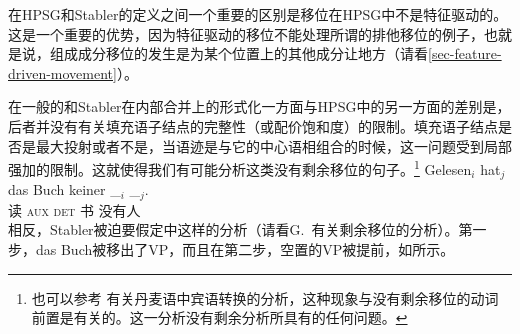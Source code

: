 在HPSG和Stabler的定义之间一个重要的区别是移位在HPSG中不是特征驱动的。这是一个重要的优势，因为特征驱动的移位不能处理所谓的排他移位\citep{Fanselow2003b}的例子，也就是说，组成成分移位的发生是为某个位置上的其他成分让地方（请看\ref{sec-feature-driven-movement}）。

在一般的\xbartc 和Stabler在内部合并上的形式化一方面与HPSG中的另一方面的差别是，后者并没有有关填充语子结点的完整性（或配价饱和度）的限制。填充语子结点是否是最大投射或者不是，当语迹是与它的中心语相组合的时候，这一问题受到局部强加的限制。这就使得我们有可能分析这类没有剩余移位的句子。\footnote{%
也可以参考 有关丹麦语中宾语转换的分析，这种现象与没有剩余移位的动词前置是有关的。这一分析没有剩余分析所具有的任何问题。
}
\ea
\gll Gelesen$_i$ hat$_j$ das Buch keiner \_$_i$ \_$_j$.\\
        读 \textsc{aux} \textsc{det} 书 没有人\\
\z
相反，Stabler被迫要假定中这样的分析（请看G.\ 
 有关剩余移位的分析）。第一步，das Buch被移出了VP，而且在第二步，空置的VP被提前，如所示。
